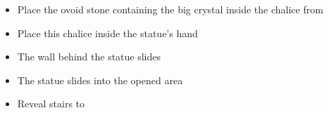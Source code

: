 \begin{highlight}[To \nameref{l2}]
    \begin{itemize}
        \item Place the ovoid stone containing the big crystal inside the chalice from \textbf{}
        \item Place this chalice inside the statue's hand
        \item The wall behind the statue slides
        \item The statue slides into the opened area
        \item Reveal stairs to \textbf{}
    \end{itemize}
\end{highlight}
